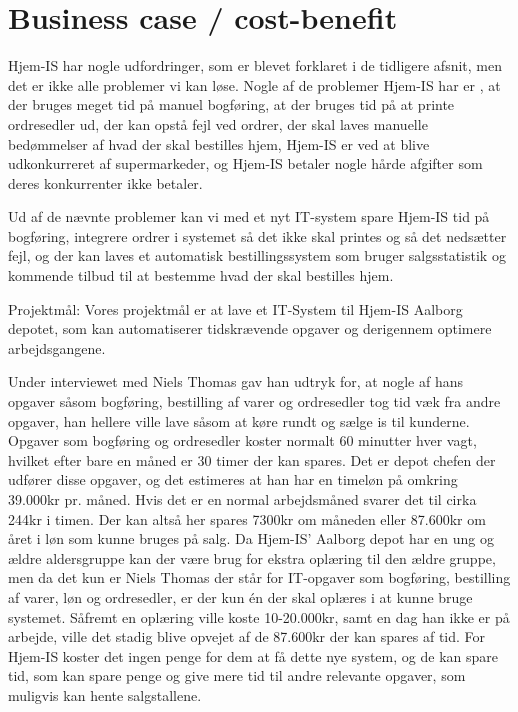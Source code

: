 \section{Business case / cost-benefit}\label{businesscase}
Hjem-IS har nogle udfordringer, som er blevet forklaret i de tidligere afsnit, men det er ikke alle problemer vi kan løse. Nogle af de problemer Hjem-IS har er , at der bruges meget tid på manuel bogføring, at der bruges tid på at printe ordresedler ud, der kan opstå fejl ved ordrer, der skal laves manuelle bedømmelser af hvad der skal bestilles hjem, Hjem-IS er ved at blive udkonkurreret af supermarkeder, og Hjem-IS betaler nogle hårde afgifter som deres konkurrenter ikke betaler.

Ud af de nævnte problemer kan vi med et nyt IT-system spare Hjem-IS tid på bogføring, integrere ordrer i systemet så det ikke skal printes og så det nedsætter fejl, og der kan laves et automatisk bestillingssystem som bruger salgsstatistik og kommende tilbud til at bestemme hvad der skal bestilles hjem. 

Projektmål:
Vores projektmål er at lave et IT-System til Hjem-IS Aalborg depotet, som kan automatiserer tidskrævende opgaver og derigennem optimere arbejdsgangene.

Under interviewet med Niels Thomas gav han udtryk for, at nogle af hans opgaver såsom bogføring, bestilling af varer og ordresedler tog tid væk fra andre opgaver, han hellere ville lave såsom at køre rundt og sælge is til kunderne. 
Opgaver som bogføring og ordresedler koster normalt 60 minutter hver vagt, hvilket efter bare en måned er 30 timer der kan spares. Det er depot chefen der udfører disse opgaver, og det estimeres at han har en timeløn på omkring 39.000kr pr. måned. Hvis det er en normal arbejdsmåned svarer det til cirka 244kr i timen. Der kan altså her spares 7300kr om måneden eller 87.600kr om året i løn som kunne bruges på salg. 
Da Hjem-IS’ Aalborg depot har en ung og ældre aldersgruppe kan der være brug for ekstra oplæring til den ældre gruppe, men da det kun er Niels Thomas der står for IT-opgaver som bogføring, bestilling af varer, løn og ordresedler, er der kun én der skal oplæres i at kunne bruge systemet. Såfremt en oplæring ville koste 10-20.000kr, samt en dag han ikke er på arbejde, ville det stadig blive opvejet af de 87.600kr der kan spares af tid.
For Hjem-IS koster det ingen penge for dem at få dette nye system, og de kan spare tid, som kan spare penge og give mere tid til andre relevante opgaver, som muligvis kan hente salgstallene.

